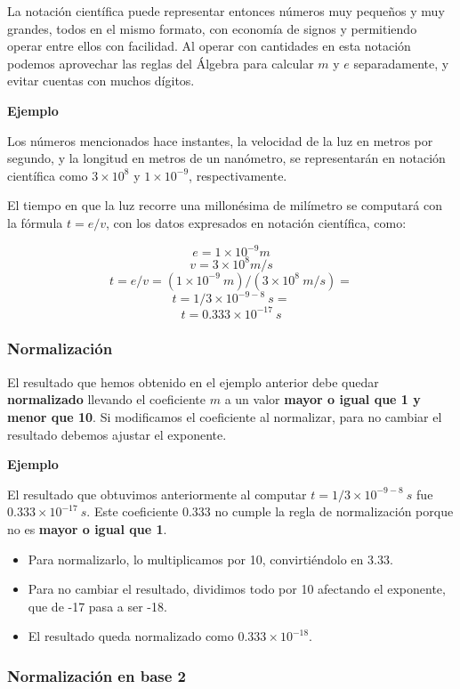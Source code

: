 \documentclass[spanish,A4,]{article}
\begin{document}
La notación científica puede representar entonces números muy pequeños y
muy grandes, todos en el mismo formato, con economía de signos y
permitiendo operar entre ellos con facilidad. Al operar con cantidades
en esta notación podemos aprovechar las reglas del Álgebra para calcular
$m$ y $e$ separadamente, y evitar cuentas con muchos dígitos.

\textbf{Ejemplo}

Los números mencionados hace instantes, la velocidad de la luz en metros
por segundo, y la longitud en metros de un nanómetro, se representarán
en notación científica como $3\times10^8$ y $1\times10^{-9}$,
respectivamente.

El tiempo en que la luz recorre una millonésima de milímetro se
computará con la fórmula $t = e/v$, con los datos expresados en notación
científica, como:

\[e = 1\times10^{-9}m\] \[v = 3\times10^{8}m/s\]
\[t = e / v = (1 \times 10^{-9}\ m) / (3 \times 10^8\ m/s) = \]
\[t = 1 / 3 \times 10^{-9-8}\ s =\] \[t = 0.333 \times 10^{-17}\ s\]

\subsubsection{Normalización}\label{normalizaciuxf3n}

El resultado que hemos obtenido en el ejemplo anterior debe quedar
\textbf{normalizado} llevando el coeficiente $m$ a un valor
\textbf{mayor o igual que 1 y menor que 10}. Si modificamos el
coeficiente al normalizar, para no cambiar el resultado debemos ajustar
el exponente.

\textbf{Ejemplo}

El resultado que obtuvimos anteriormente al computar
$t = 1 / 3 \times 10^{-9-8}\ s $ fue $0.333 \times 10^{-17}\ s$. Este
coeficiente $0.333$ no cumple la regla de normalización porque no es
\textbf{mayor o igual que 1}.

\begin{itemize}
\itemsep1pt\parskip0pt
\item
  Para normalizarlo, lo multiplicamos por 10, convirtiéndolo en $3.33$.
\item
  Para no cambiar el resultado, dividimos todo por 10 afectando el
  exponente, que de -17 pasa a ser -18.
\item
  El resultado queda normalizado como $0.333\times 10^{-18}$.
\end{itemize}

\subsubsection{Normalización en base
2}\label{normalizaciuxf3n-en-base-2}
\end{document}
